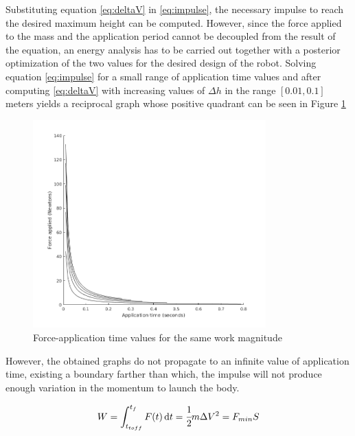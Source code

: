 Substituting equation \ref{eq:deltaV} in \ref{eq:impulse}, the necessary impulse to reach the desired maximum height can be computed.
However, since the force applied to the mass and the application period cannot be decoupled from the result of the equation, an energy analysis has to be carried out together with a posterior optimization of the two values for the desired design of the robot.
Solving equation \ref{eq:impulse} for a small range of application time values and after computing \ref{eq:deltaV} with increasing values of $\Delta h$ in the range $[0.01,0.1]$ meters yields a reciprocal graph whose positive quadrant can be seen in Figure \ref{fig:f-t}

\begin{figure}[ht!]
	\centering
	\includegraphics[width=0.8\textwidth]{figures/force-timePlot.png}
	\caption{Force-application time values for the same work magnitude}
	\label{fig:f-t}
\end{figure}

However, the obtained graphs do not propagate to an infinite value of application time, existing a boundary farther than which, the impulse will not produce enough variation in the momentum to launch the body.

\begin{equation}
\label{eq:work}
	W = \int_{t_{toff}}^{t_{f}} F(t)\,\mathrm{d}t = \cfrac{1}{2} m \Delta V^2 = F_{min} S
\end{equation}

